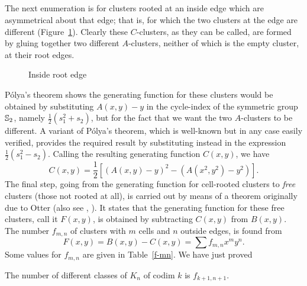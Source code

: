 \documentclass[10pt]{amsart}
\begin{document}
    \subsection{}
    The next enumeration is for clusters rooted at an inside edge which are asymmetrical about that edge; that is, for which the two clusters at the edge are different (Figure~\ref{irootedge}).  Clearly these $C$-clusters, as they can be called, are formed by gluing together two different $A$-clusters, neither of which is the empty cluster, at their root edges. 
    
    \begin{figure}[h]
    \caption{Inside root edge}
    \label{irootedge}
    \end{figure}
    
    P\'{o}lya's theorem shows the generating function for these clusters would be obtained by substituting $A(x, y) - y$ in the cycle-index of the symmetric group $\mathbb S_2$, namely $\frac{1}{2}(s_1^2  +  s_2)$, but for the fact that we want the two $A$-clusters to be different.  A variant of P\'{o}lya's theorem, which is well-known but in any case easily verified, provides the required result by substituting instead in the expression $\frac{1}{2}(s_1^2  -  s_2)$. Calling the resulting generating function
    $C(x, y)$, we have 
    $$C(x, y) =\frac{1}{2}[(A(x, y)-y)^2 - (A(x^2, y^2)-y^2)].$$
    The final step, going from the generating function for cell-rooted clusters to {\em free} clusters (those not rooted at all), is carried out by means of a theorem originally due to Otter \cite{ott} (also see \cite{hp}, \cite[\S4]{r1}). It states that the generating function for these free clusters, call it $F(x, y)$, is obtained by subtracting $C(x, y)$ from $B(x, y)$.  The number $f_{m,n}$ of clusters with $m$ cells and $n$ outside edges, is found from
    $$F(x, y) = B(x,y) - C(x,y) = \sum f_{m,n}x^m y^n.$$
    Some values for $f_{m,n}$ are given in Table~\ref{f-mn}.  We have just proved
    
    \begin{thm} [Solution to {\em P1}\,]
    The number of different classes of $K_n$ of codim $k$ is $f_{k+1,n+1}$. 
    \end{thm}
    
    
\end{document}
